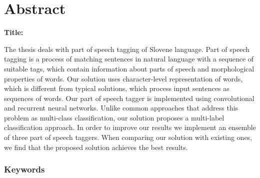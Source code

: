 \chapter*{Abstract}

\noindent\textbf{Title:} \ttitleEn
\bigskip

The thesis deals with part of speech tagging of Slovene language. Part of speech tagging is a process of matching sentences in natural language with a sequence of suitable tags, which contain information about parts of speech and morphological properties of words. Our solution uses character-level representation of words, which is different from typical solutions, which process input sentences as sequences of words. Our part of speech tagger is implemented using convolutional and recurrent neural networks. Unlike common approaches that address this problem as multi-class classification, our solution proposes a multi-label classification approach. In order to improve our results we implement an ensemble of three part of speech taggers. When comparing our solution with existing ones, we find that the proposed solution achieves the best results.

\subsection*{Keywords}
\textit{\tkeywordsEn}
\clearemptydoublepage
